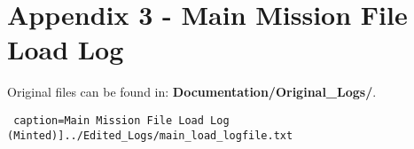 \documentclass[12pt]{article}
\begin{document}
\section*{Appendix 3 - Main Mission File Load Log}

Original files can be found in: \textbf{Documentation/Original\_Logs/}.

\texttt{ caption=Main Mission File Load Log (Minted)]{../Edited_Logs/main_load_logfile.txt}}
\end{document}
